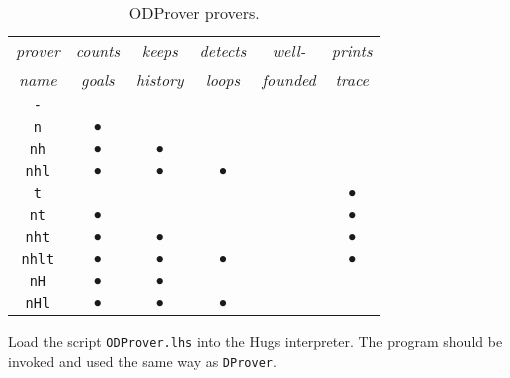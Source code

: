 \begin{table}[h]

\setMyFontSize

\centering


\begin{tabular}{|c|c|c|c|c|c|} \hline

\emph{prover} & \emph{counts} & \emph{keeps}   & \emph{detects} & \emph{well-}   & \emph{prints} \\ 
\emph{name}   & \emph{goals}  & \emph{history} & \emph{loops}   & \emph{founded} & \emph{trace}  \\ \hline
\verb"-"      &               &                &                &                &               \\ 
\verb"n"      & $\bullet$     &                &                &                &               \\ 
\verb"nh"     & $\bullet$     & $\bullet$      &                &                &               \\ 
\verb"nhl"    & $\bullet$     & $\bullet$      & $\bullet$      &                &               \\
\verb"t"      &               &                &                &                & $\bullet$     \\ 
\verb"nt"     & $\bullet$     &                &                &                & $\bullet$     \\ 
\verb"nht"    & $\bullet$     & $\bullet$      &                &                & $\bullet$     \\ 
\verb"nhlt"   & $\bullet$     & $\bullet$      & $\bullet$      &                & $\bullet$     \\ 
\verb"nH"     & $\bullet$     & $\bullet$      &                &                &               \\ 
\verb"nHl"    & $\bullet$     & $\bullet$      & $\bullet$      &                &               \\ \hline
\end{tabular}

\caption{\setMyFontSize\label{flatHistProversTable}ODProver 
provers.}

\end{table}


Load the script {\tt ODProver.lhs} into the Hugs
interpreter. The program should be invoked and
used the same way as {\tt DProver}.
